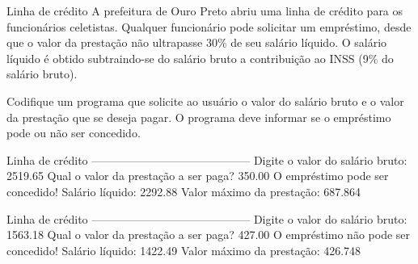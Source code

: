 \documentclass[11pt,fleqn]{practice}
\begin{document}
\begin{task}[breakable]{Linha de crédito}{}
  A prefeitura de Ouro Preto abriu uma linha de crédito para os
  funcionários celetistas. Qualquer funcionário pode solicitar um
  empréstimo, desde que o valor da prestação não ultrapasse 30\% de seu
  salário líquido. O salário líquido é obtido subtraindo-se do salário
  bruto a contribuição ao INSS (9\% do salário bruto).

  Codifique um programa que solicite ao usuário o valor do salário bruto
  e o valor da prestação que se deseja pagar. O programa deve informar
  se o empréstimo pode ou não ser concedido.

  \begin{runexample}
Linha de crédito
------------------------------------------
Digite o valor do salário bruto: 2519.65
Qual o valor da prestação a ser paga? 350.00
O empréstimo pode ser concedido!
Salário líquido: 2292.88
Valor máximo da prestação: 687.864
  \end{runexample}

  \begin{runexample}
Linha de crédito
------------------------------------------
Digite o valor do salário bruto: 1563.18
Qual o valor da prestação a ser paga? 427.00
O empréstimo não pode ser concedido!
Salário líquido: 1422.49
Valor máximo da prestação: 426.748
  \end{runexample}

  \tcblower
  \solution
\end{task}
\end{document}
